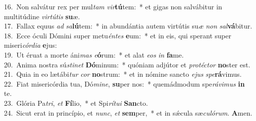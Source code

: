 {16.~}Non salvátur rex per mul\textit{tam} \textit{vir}\textbf{tú}tem:~* et gigas non salvábitur in multitúdine \textit{vir}\textit{tú}\textit{tis} \textbf{su}æ.\\
{17.~}Fallax equus \textit{ad} \textit{sa}\textbf{lú}tem:~* in abundántia autem virtútis su\textit{æ} \textit{non} \textit{sal}\textbf{vá}bitur.\\
{18.~}Ecce óculi Dómini super metu\textit{én}\textit{tes} \textbf{e}um:~* et in eis, qui sperant super miseri\textit{cór}\textit{di}\textit{a} \textbf{e}jus:\\
{19.~}Ut éruat a morte áni\textit{mas} \textit{e}\textbf{ó}rum:~* et alat \textit{e}\textit{os} \textit{in} \textbf{fa}me.\\
{20.~}Anima nostra sú\textit{sti}\textit{net} \textbf{Dó}minum:~* quóniam adjútor et \textit{pro}\textit{té}\textit{ctor} \textbf{no}ster est.\\
{21.~}Quia in eo lætábi\textit{tur} \textit{cor} \textbf{no}strum:~* et in nómine sancto \textit{e}\textit{jus} \textit{spe}\textbf{rá}vimus.\\
{22.~}Fiat misericórdia tua, Dó\textit{mi}\textit{ne}, \textbf{su}per nos:~* quemádmodum spe\textit{rá}\textit{vi}\textit{mus} \textbf{in} te.\\
{23.~}Glória Pa\textit{tri}, \textit{et} \textbf{Fí}lio,~* et Spi\textit{rí}\textit{tu}\textit{i} \textbf{San}cto.\\
{24.~}Sicut erat in princípio, et \textit{nunc}, \textit{et} \textbf{sem}per,~* et in sǽcula sæ\textit{cu}\textit{ló}\textit{rum}. \textbf{A}men.\\
